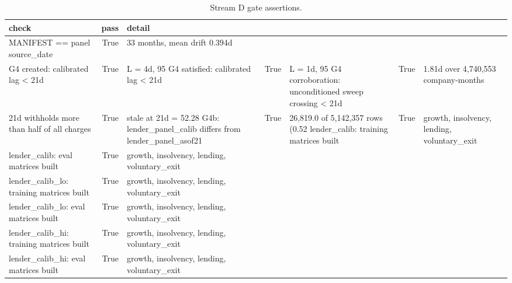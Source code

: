 \begin{table}
\caption{Stream D gate assertions.}
\label{tab:nb16_gate_checks}
\begin{tabular}{lrl}
\toprule
check & pass & detail \\
\midrule
MANIFEST == panel source_date & True & 33 months, mean drift 0.394d \\
G4 created: calibrated lag < 21d & True & L = 4d, 95%
G4 satisfied: calibrated lag < 21d & True & L = 1d, 95%
G4 corroboration: unconditioned sweep crossing < 21d & True & 1.81d over 4,740,553 company-months \\
21d withholds more than half of all charges & True & stale at 21d = 52.28%
G4b: lender_panel_calib differs from lender_panel_asof21 & True & 26,819.0 of 5,142,357 rows (0.52%
lender_calib: training matrices built & True & growth, insolvency, lending, voluntary_exit \\
lender_calib: eval matrices built & True & growth, insolvency, lending, voluntary_exit \\
lender_calib_lo: training matrices built & True & growth, insolvency, lending, voluntary_exit \\
lender_calib_lo: eval matrices built & True & growth, insolvency, lending, voluntary_exit \\
lender_calib_hi: training matrices built & True & growth, insolvency, lending, voluntary_exit \\
lender_calib_hi: eval matrices built & True & growth, insolvency, lending, voluntary_exit \\
\bottomrule
\end{tabular}
\end{table}
